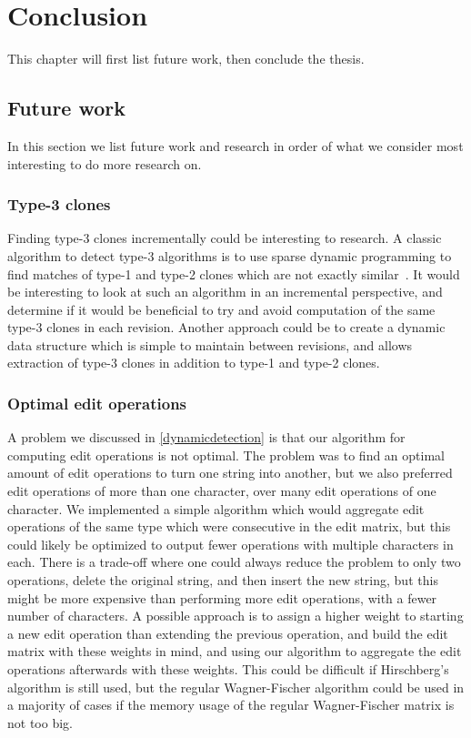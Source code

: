 \chapter{Conclusion}
\label{conclusion}

This chapter will first list future work, then conclude the thesis.

\section{Future work}

In this section we list future work and research in order of what we consider most
interesting to do more research on.

\subsection*{Type-3 clones}

Finding type-3 clones incrementally could be interesting to research. A classic algorithm
to detect type-3 algorithms is to use sparse dynamic programming to find matches of type-1
and type-2 clones which are not exactly similar~\cite{BakerSparseDynamicProgramming}. It
would be interesting to look at such an algorithm in an incremental perspective, and
determine if it would be beneficial to try and avoid computation of the same type-3 clones
in each revision. Another approach could be to create a dynamic data structure which is
simple to maintain between revisions, and allows extraction of type-3 clones in addition
to type-1 and type-2 clones. 


\subsection*{Optimal edit operations}

A problem we discussed in \cref{dynamicdetection} is that our algorithm for computing edit
operations is not optimal. The problem was to find an optimal amount of edit operations to
turn one string into another, but we also preferred edit operations of more than one
character, over many edit operations of one character. We implemented a simple algorithm
which would aggregate edit operations of the same type which were consecutive in the edit
matrix, but this could likely be optimized to output fewer operations with multiple
characters in each. There is a trade-off where one could always reduce the problem to only
two operations, delete the original string, and then insert the new string, but this might
be more expensive than performing more edit operations, with a fewer number of characters.
A possible approach is to assign a higher weight to starting a new edit operation than
extending the previous operation, and build the edit matrix with these weights in mind,
and using our algorithm to aggregate the edit operations afterwards with these weights.
This could be difficult if Hirschberg's algorithm is still used, but the regular
Wagner-Fischer algorithm could be used in a majority of cases if the memory usage of the
regular Wagner-Fischer matrix is not too big.


